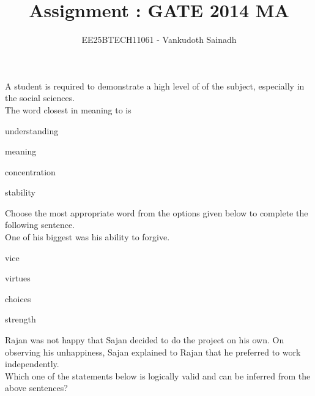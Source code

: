 \documentclass[journal,12pt,onecolumn]{IEEEtran}
\theoremstyle{remark}
\begin{document}
\title{
Assignment : GATE 2014 MA}
\author{EE25BTECH11061 - Vankudoth Sainadh}
\maketitle
\renewcommand{\thefigure}{\theenumi}
\renewcommand{\thetable}{\theenumi}

\begin{enumerate}

\item A student is required to demonstrate a high level of \underline{} of the subject, especially in the social sciences.\\
The word closest in meaning to \underline{} is 

\hfill{

\begin{enumerate}
\begin{multicols}{4}
\item understanding
\item meaning
\item concentration
\item stability
\end{multicols}
\end{enumerate}

\item Choose the most appropriate word from the options given below to complete the following sentence.\\
One of his biggest \underline{\hspace{2cm}} was his ability to forgive. 

\hfill{

\begin{enumerate}
\begin{multicols}{4}
\item vice
\item virtues
\item choices
\item strength
\end{multicols}
\end{enumerate}

\item Rajan was not happy that Sajan decided to do the project on his own. On observing his unhappiness, Sajan explained to Rajan that he preferred to work independently.\\
Which one of the statements below is logically valid and can be inferred from the above sentences?

}}
\end{enumerate}
\end{document}
